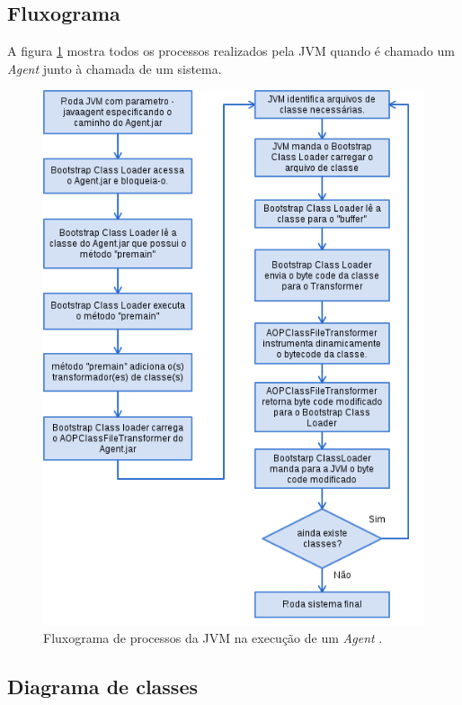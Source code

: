 \documentclass[tc,oneside]{iiufrgs}
\begin{document}
\subsection{Fluxograma}

A figura \ref{fig:fluxogramaAgent} mostra todos os processos realizados pela JVM quando é chamado um \textit{Agent} junto à chamada de um sistema.

\begin{figure}[ht]
	\centering
	\includegraphics[scale=0.6]{diagramas/fluxograma_Agent.png}
	\caption{Fluxograma de processos da JVM na execução de um \textit{Agent} \cite{stark2001java}.}
	\label{fig:fluxogramaAgent}
\end{figure}

\subsection{Diagrama de classes}
\end{document}
